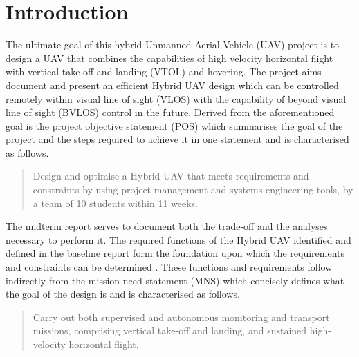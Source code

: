 \chapter{Introduction}

The ultimate goal of this hybrid Unmanned Aerial Vehicle (UAV) project is to design a UAV that combines the capabilities of high velocity horizontal flight with vertical take-off and landing (VTOL) and hovering. The project aims document and present an efficient Hybrid UAV design which can be controlled remotely within visual line of sight (VLOS) with the capability of beyond visual line of sight (BVLOS) control in the future. Derived from the aforementioned goal is the project objective statement (POS) which summarises the goal of the project and the steps required to achieve it in one statement and is characterised as follows.


\begin{quote}
	\begin{itshape}
	Design and optimise a Hybrid UAV that meets requirements and constraints by using project management and systems engineering tools, by a team of 10 students within 11 weeks.
	\end{itshape}
\end{quote}

The midterm report serves to document both the trade-off and the analyses necessary to perform it. The required functions of the Hybrid UAV identified and defined in the baseline report form the foundation upon which the requirements and constraints can be determined \cite{baseline}. These functions and requirements follow indirectly from the mission need statement (MNS) which concisely defines what the goal of the design is and is characterised as follows.

\begin{quote}
\begin{itshape}
Carry out both supervised and autonomous monitoring and transport missions, comprising vertical take-off and landing, and sustained high-velocity horizontal flight.
\end{itshape}
\end{quote}

